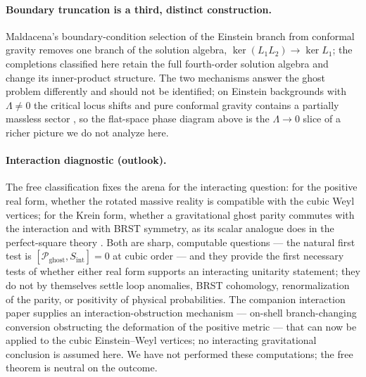 \documentclass[11pt]{article}
\theoremstyle{definition}
\theoremstyle{remark}
\begin{document}
\paragraph{Boundary truncation is a third, distinct construction.}
Maldacena's boundary-condition selection of the Einstein branch from
conformal gravity \cite{Maldacena} removes one branch of the solution
algebra, $\ker(L_1L_2)\to\ker L_1$; the completions classified here retain
the full fourth-order solution algebra and change its inner-product
structure.  The two mechanisms answer the ghost problem differently and
should not be identified; on Einstein backgrounds with $\Lambda\neq0$ the
critical locus shifts \cite{LuPope} and pure conformal gravity contains a
partially massless sector \cite{DeserWaldron}, so the flat-space phase
diagram above is the $\Lambda\to0$ slice of a richer picture we do not
analyze here.

\paragraph{Interaction diagnostic (outlook).}
The free classification fixes the arena for the interacting question: for
the positive real form, whether the rotated massive reality is compatible
with the cubic Weyl vertices; for the Krein form, whether a gravitational
ghost parity commutes with the interaction and with BRST symmetry, as its
scalar analogue does in the perfect-square theory \cite{BT2026}.  Both are
sharp, computable questions --- the natural first test is
$[\mathcal P_{\mathrm{ghost}},S_{\mathrm{int}}]=0$ at cubic order --- and
they provide the first necessary tests of whether either real form
supports an interacting unitarity statement; they do not by themselves
settle loop anomalies, BRST cohomology, renormalization of the parity, or
positivity of physical probabilities.  The companion interaction paper
\cite{companionV} supplies an interaction-obstruction mechanism ---
on-shell branch-changing conversion obstructing the deformation of the
positive metric --- that can now be applied to the cubic Einstein--Weyl
vertices; no interacting gravitational conclusion is assumed here.  We
have not performed these computations; the free theorem is neutral on
the outcome.
\end{document}
